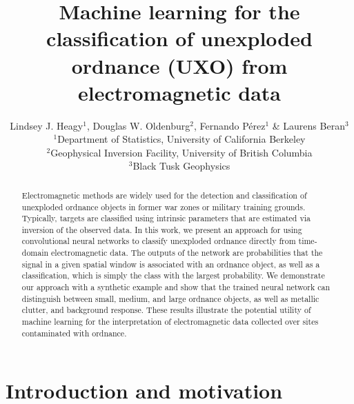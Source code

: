 \documentclass{segabs}
\begin{document}
\title{Machine learning for the classification of unexploded ordnance (UXO) from electromagnetic data}

\author{
    Lindsey J. Heagy$^1$, Douglas W. Oldenburg$^2$, Fernando P\'erez$^1$ \& Laurens Beran$^3$ \\
    $^1$Department of Statistics, University of California Berkeley \\
    $^2$Geophysical Inversion Facility, University of British Columbia \\
    $^3$Black Tusk Geophysics
}


\maketitle

\begin{abstract}

Electromagnetic methods are widely used for the detection and classification of unexploded ordnance objects in former war zones or military training grounds. Typically, targets are classified using intrinsic parameters that are estimated via inversion of the observed data. In this work, we present an approach for using convolutional neural networks to classify unexploded ordnance directly from time-domain electromagnetic data. The outputs of the network are probabilities that the signal in a given spatial window is associated with an ordnance object, as well as a classification, which is simply the class with the largest probability. We demonstrate our approach with a synthetic example and show that the trained neural network can distinguish between small, medium, and large ordnance objects, as well as metallic clutter, and background response. These results illustrate the potential utility of machine learning for the interpretation of electromagnetic data collected over sites contaminated with ordnance.

\end{abstract}

\section{Introduction and motivation}
\end{document}
